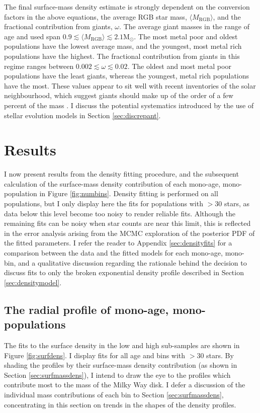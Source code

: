 The final surface-mass density estimate is strongly dependent on the conversion factors in the above equations, the average RGB star mass, $\langle M_{\mathrm{RGB}} \rangle$, and the fractional contribution from giants, $\omega$. The average giant masses in the range of age and \feh{} used span $0.9 \lesssim \langle M_{\mathrm{RGB}} \rangle \lesssim 2.1 \mathrm{M_{\odot}}$. The most metal poor and oldest populations have the lowest average mass, and the youngest, most metal rich populations have the highest. The fractional contribution from giants in this regime ranges between $0.002 \lesssim \omega \lesssim 0.02 $. The oldest and most metal poor populations have the least giants, whereas the youngest, metal rich populations have the most. These values appear to sit well with recent inventories of the solar neighbourhood, which suggest giants should make up of the order of a few percent of the mass \citep{2015ApJ...814...13M}. I discuss the potential systematics introduced by the use of stellar evolution models in Section \ref{sec:discrepant}.


\section{Results}
\label{sec:resultsa}
I now present results from the density fitting procedure, and the subsequent calculation of the surface-mass density contribution of each mono-age, mono-\feh{} population in Figure \ref{fig:numbins}. Density fitting is performed on all populations, but I only display here the fits for populations with $> 30$ stars, as data below this level become too noisy to render reliable fits. Although the remaining fits can be noisy when star counts are near this limit, this is reflected in the error analysis arising from the MCMC exploration of the posterior PDF of the fitted parameters. I refer the reader to Appendix \ref{sec:densityfits} for a comparison between the data and the fitted models for each mono-age, mono-\feh{} bin, and a qualitative discussion regarding the rationale behind the decision to discuss fits to only the broken exponential density profile described in Section \ref{sec:densitymodel}.

\subsection{The radial profile of mono-age, mono-\feh{} populations}
The fits to the surface density in the low and high \afe{} sub-samples are shown in Figure \ref{fig:surfdens}. I display fits for all age and \feh{} bins with $> 30$ stars. By shading the profiles by their surface-mass density contribution (as shown in Section \ref{sec:surfmassdens}), I intend to draw the eye to the profiles which contribute most to the mass of the Milky Way disk. I defer a discussion of the individual mass contributions of each bin to Section \ref{sec:surfmassdens}, concentrating in this section on trends in the shapes of the density profiles. 


